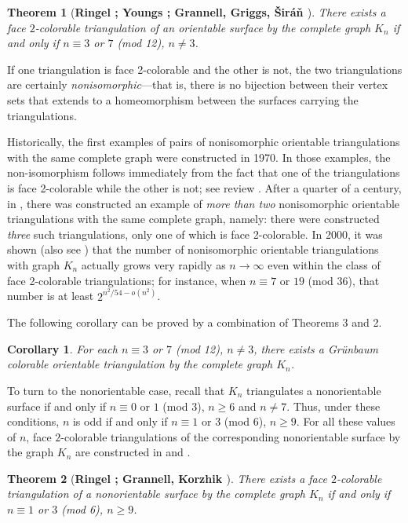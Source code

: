\documentclass[12pt]{article}
\newtheorem{theorem}{Theorem}
\newtheorem{corollary}{Corollary}
\begin{document}
\begin{theorem}  [\bf \bf Ringel \cite{R}; Youngs \cite{Y}; Grannell, Griggs, \v{S}ir\'a\v{n} \cite{GGS}]
There exists a face $2$-colorable triangulation of an orientable surface by the complete graph $K_n$  if and only if $n\equiv 3$  or $7$ {\rm (mod 12)},  $n \ne 3$.
\end{theorem}

If one triangulation is face 2-colorable and the other is not, the two triangulations are certainly  \textit{nonisomorphic}---that is, there is no bijection between their vertex sets that extends to a homeomorphism between the surfaces carrying the triangulations. 

Historically, the first examples of pairs of nonisomorphic orientable triangulations with the same complete graph were constructed \cite{Y} in 1970. In those examples, the non-isomorphism follows immediately from the fact that one of the triangulations is face 2-colorable while the other is not; see review \cite{GG}. After a quarter of a century, in \cite{LNW}, there was constructed an example of {\it more than two} nonisomorphic orientable triangulations with the same complete graph, namely: there were constructed {\it three} such triangulations, only one of which is face 2-colorable. In 2000, it was shown \cite{BGGS} (also see \cite{GG}) that the number of nonisomorphic orientable triangulations with graph $K_n$  actually grows very rapidly as $n \to \infty$  even within the class of face 2-colorable triangulations; for instance, when $n\equiv 7$ or $19$ (mod $36$), that number is at least $2^{n^2/54-o(n^2)}$. 

The following corollary can be proved by a combination of Theorems 3 and 2.

\begin{corollary}
For each $n\equiv 3$ or $7$ {\rm (mod 12)},  $n \ne 3$,  there exists a Gr\"unbaum colorable orientable triangulation by the complete graph $K_n$.
\end{corollary}
   
To turn to the nonorientable case, recall \cite{R} that $K_n$  triangulates a nonorientable surface if and only if $n\equiv 0$ or $1$ (mod 3), $n \geqslant 6$  and $n \ne 7$.  Thus, under these conditions, $n$  is odd if and only if $n\equiv 1$  or $3$ (mod $6$), $n\geqslant 9$.  For all these values of $n$,  face $2$-colorable triangulations of the corresponding nonorientable surface by the graph $K_n$ are constructed in \cite{R} and \cite{GKo}.

\begin{theorem} [\bf Ringel \cite{R}; Grannell, Korzhik \cite{GKo}]
There exists a face $2$-colorable triangulation of a nonorientable surface by the complete graph $K_n$  if and only if $n\equiv 1$  or $3$ {\rm (mod 6)}, $n\geqslant 9$.
\end{theorem}
\end{document}
